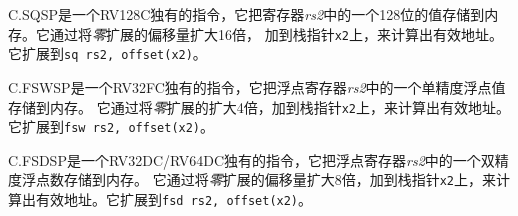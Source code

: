 C.SQSP是一个RV128C独有的指令，它把寄存器{\em rs2}中的一个128位的值存储到内存。它通过将{\em 零}扩展的偏移量扩大16倍，
加到栈指针{\tt x2}上，来计算出有效地址。它扩展到{\tt sq rs2, offset(x2)}。

C.FSWSP是一个RV32FC独有的指令，它把浮点寄存器{\em rs2}中的一个单精度浮点值存储到内存。
它通过将{\em 零}扩展的扩大4倍，加到栈指针{\tt x2}上，来计算出有效地址。它扩展到{\tt fsw rs2, offset(x2)}。

C.FSDSP是一个RV32DC/RV64DC独有的指令，它把浮点寄存器{\em rs2}中的一个双精度浮点数存储到内存。
它通过将{\em 零}扩展的偏移量扩大8倍，加到栈指针{\tt x2}上，来计算出有效地址。它扩展到{\tt fsd rs2, offset(x2)}。

